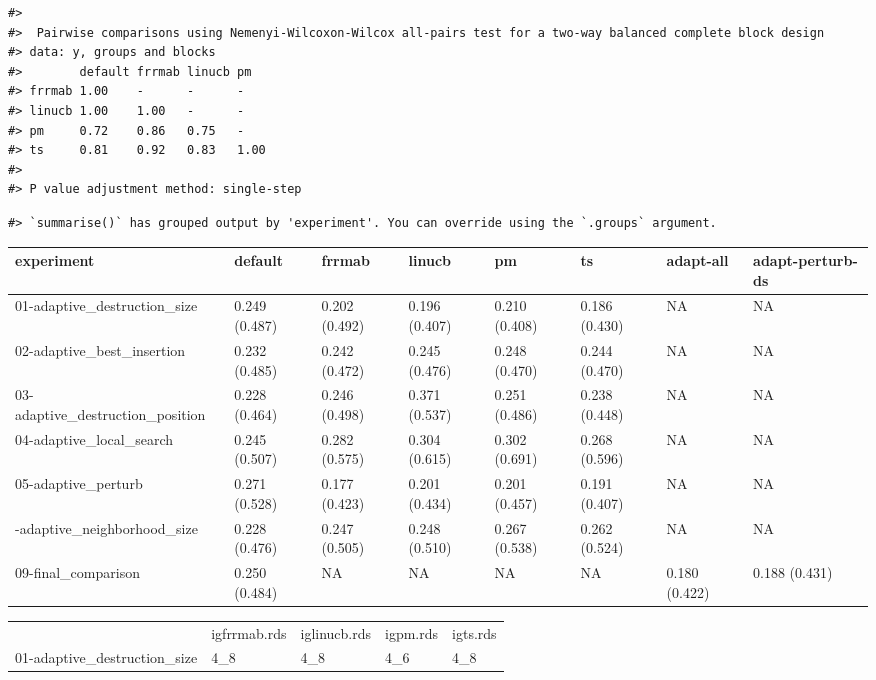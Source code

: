 \documentclass[
]{article}
\begin{document}
\begin{verbatim}
#> 
#>  Pairwise comparisons using Nemenyi-Wilcoxon-Wilcox all-pairs test for a two-way balanced complete block design
#> data: y, groups and blocks
#>        default frrmab linucb pm  
#> frrmab 1.00    -      -      -   
#> linucb 1.00    1.00   -      -   
#> pm     0.72    0.86   0.75   -   
#> ts     0.81    0.92   0.83   1.00
#> 
#> P value adjustment method: single-step
\end{verbatim}

\begin{verbatim}
#> `summarise()` has grouped output by 'experiment'. You can override using the `.groups` argument.
\end{verbatim}

\begin{tabular}{llllllll}
\toprule
experiment & default & frrmab & linucb & pm & ts & adapt-all & adapt-perturb-ds\\
\midrule
01-adaptive\_destruction\_size & 0.249 (0.487) & 0.202 (0.492) & 0.196 (0.407) & 0.210 (0.408) & 0.186 (0.430) & NA & NA\\
02-adaptive\_best\_insertion & 0.232 (0.485) & 0.242 (0.472) & 0.245 (0.476) & 0.248 (0.470) & 0.244 (0.470) & NA & NA\\
03-adaptive\_destruction\_position & 0.228 (0.464) & 0.246 (0.498) & 0.371 (0.537) & 0.251 (0.486) & 0.238 (0.448) & NA & NA\\
04-adaptive\_local\_search & 0.245 (0.507) & 0.282 (0.575) & 0.304 (0.615) & 0.302 (0.691) & 0.268 (0.596) & NA & NA\\
05-adaptive\_perturb & 0.271 (0.528) & 0.177 (0.423) & 0.201 (0.434) & 0.201 (0.457) & 0.191 (0.407) & NA & NA\\
\addlinespace
06-adaptive\_neighborhood\_size & 0.228 (0.476) & 0.247 (0.505) & 0.248 (0.510) & 0.267 (0.538) & 0.262 (0.524) & NA & NA\\
09-final\_comparison & 0.250 (0.484) & NA & NA & NA & NA & 0.180 (0.422) & 0.188 (0.431)\\
\bottomrule
\end{tabular}

\captionsetup[table]{labelformat=empty,skip=1pt}
\begin{longtable}{lllll}
\toprule
  &    &     &      &       \\ 
\midrule
 & igfrrmab.rds & iglinucb.rds & igpm.rds & igts.rds \\ 
01-adaptive\_destruction\_size & 4\_8 & 4\_8 & 4\_6 & 4\_8 \\ 
\bottomrule
\end{longtable}
\end{document}
